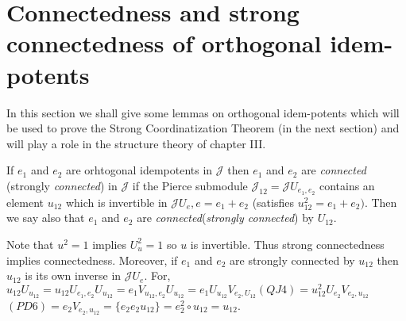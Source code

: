 \section[Connectedness and strong connectedness of...]{Connectedness
  and strong connectedness of orthogonal 
  idem-potents}\label{c2:sec3}

In this  section we shall give some lemmas on orthogonal idem-potents
which will be used to prove the Strong Coordinatization Theorem (in
the next section) and will play a role in the structure theory of
chapter III.

\setcounter{defn}{0}
\begin{defn}\label{c2:defn1}
If $e_1$ and $e_2$ are orhtogonal idempotents in $\mathscr{J}$ then
$e_1$ and $e_2$ are {\em connected} (strongly {\em connected}) in
$\mathscr{J}$ if the Pierce submodule
$\mathscr{J}_{12}=\mathscr{J}U_{e_{1},e_{2}}$ contains an element
$u_{12}$ which is invertible in $\mathscr{J}U_e,e=e_{1}+e_2$
(satisfies $u^{2}_{12}=e_1+e_2)$. Then we say also that $e_1$ and
$e_2$ are {\em connected}({\em strongly connected}) by $U_{12}$.

Note that $u^{2}=1$ implies $U^{2}_u=1$ so $u$ is invertible. Thus
strong connectedness implies connectedness. Moreover, if $e_1$ and
$e_2$ are strongly connected by $u_{12}$ then $u_{12}$ is its own
  inverse in $\mathscr{J}U_e$. For,\pageoriginale
  $u_{12}U_{u_{12}}=u_{12}U_{e_{1},e_{2}}U_{u_{12}}=e_1V_{u_{12},e_{2}}U_{u_{12}}=e_1U_{u_{12}}V_{e_{2},U_{12}}(Q
  J4) =u^{2}_{12} U_{e_{2}}V_{e_{2},u_{12}}$ $(PD
  6)=e_2V_{e_{2},u_{12}}=\{e_2e_2u_{12}\}=e^{2}_2\circ u_{12}=u_{12}$.


\end{defn}

